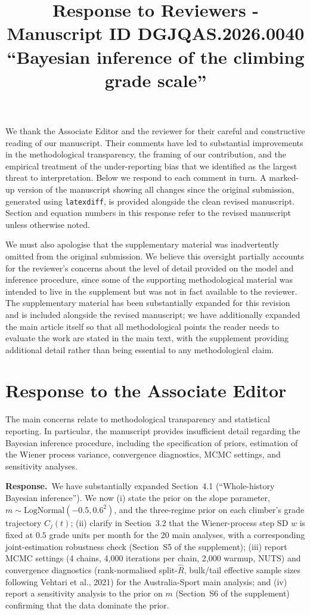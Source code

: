 \documentclass[11pt]{article}
\title{Response to Reviewers - Manuscript ID DGJQAS.2026.0040 ``Bayesian inference of the climbing grade scale''}
\author{}
\date{}
\newenvironment{review}{\begingroup\color{revcolor}\itshape\par\noindent}{\par\endgroup}
\newcommand{\response}{\par\noindent\textbf{Response.}\ }
\begin{document}
\maketitle

We thank the Associate Editor and the reviewer for their careful and constructive reading of our manuscript. Their comments have led to substantial improvements in the methodological transparency, the framing of our contribution, and the empirical treatment of the under-reporting bias that we identified as the largest threat to interpretation. Below we respond to each comment in turn. A marked-up version of the manuscript showing all changes since the original submission, generated using \texttt{latexdiff}, is provided alongside the clean revised manuscript. Section and equation numbers in this response refer to the revised manuscript unless otherwise noted.

We must also apologise that the supplementary material was inadvertently omitted from the original submission. We believe this oversight partially accounts for the reviewer's concerns about the level of detail provided on the model and inference procedure, since some of the supporting methodological material was intended to live in the supplement but was not in fact available to the reviewer. The supplementary material has been substantially expanded for this revision and is included alongside the revised manuscript; we have additionally expanded the main article itself so that all methodological points the reader needs to evaluate the work are stated in the main text, with the supplement providing additional detail rather than being essential to any methodological claim.

\section*{Response to the Associate Editor}

\begin{review}
The main concerns relate to methodological transparency and statistical reporting. In particular, the manuscript provides insufficient detail regarding the Bayesian inference procedure, including the specification of priors, estimation of the Wiener process variance, convergence diagnostics, MCMC settings, and sensitivity analyses.
\end{review}
\response We have substantially expanded Section~4.1 (``Whole-history Bayesian inference''). We now (i) state the prior on the slope parameter, $m \sim \mathrm{LogNormal}(-0.5, 0.6^2)$, and the three-regime prior on each climber's grade trajectory $C_j(t)$; (ii) clarify in Section~3.2 that the Wiener-process step SD $w$ is fixed at $0.5$ grade units per month for the 20 main analyses, with a corresponding joint-estimation robustness check (Section~S5 of the supplement); (iii) report MCMC settings (4 chains, 4{,}000 iterations per chain, 2{,}000 warmup, NUTS) and convergence diagnostics (rank-normalised split-$\hat{R}$, bulk/tail effective sample sizes following Vehtari et al., 2021) for the Australia-Sport main analysis; and (iv) report a sensitivity analysis to the prior on $m$ (Section~S6 of the supplement) confirming that the data dominate the prior.
\end{document}
